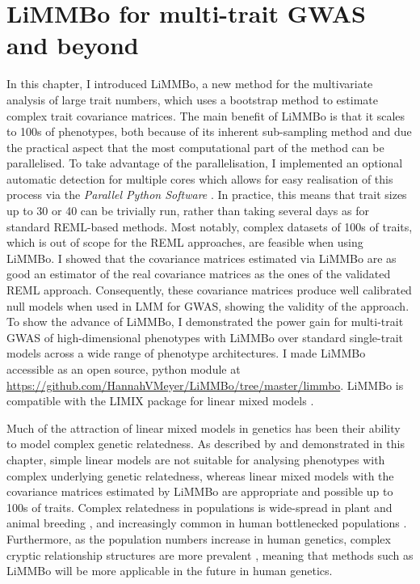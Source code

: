 \section{LiMMBo for multi-trait GWAS and beyond}
In this chapter, I introduced LiMMBo, a new method for the multivariate analysis of large trait numbers, which uses a bootstrap method to estimate complex trait covariance matrices. The main benefit of LiMMBo is that it scales to \num{100}s of phenotypes, both because of its inherent sub-sampling method and due the practical aspect that the most computational part of the method can be parallelised. To take advantage of the parallelisation, I implemented an optional automatic detection for multiple cores which allows for easy realisation of this process via the \textit{Parallel Python Software} \citep{PPSoftware}. In practice, this means that trait sizes up to 30 or 40 can be trivially run, rather than taking several days as for standard REML-based methods. Most notably, complex datasets of \num{100}s of traits, which is out of scope for the REML approaches, are feasible when using LiMMBo. I showed that the covariance matrices estimated via LiMMBo are as good an estimator of the real covariance matrices as the ones of the validated REML approach. Consequently, these covariance matrices produce well calibrated null models when used in LMM for GWAS, showing the validity of the approach. To show the advance of LiMMBo, I demonstrated the power gain for multi-trait GWAS of high-dimensional phenotypes with LiMMBo over standard single-trait models across a wide range of phenotype architectures. I made LiMMBo accessible as an open source, python module at \url{https://github.com/HannahVMeyer/LiMMBo/tree/master/limmbo}. LiMMBo is compatible with the LIMIX package for linear mixed models \citep{Lippert2014}.  

Much of the attraction of linear mixed models in genetics has been their ability to model complex genetic relatedness. As described by \citep{Kang2010} and demonstrated in this chapter, simple linear models are not suitable for analysing phenotypes with complex underlying genetic relatedness, whereas linear mixed models with the covariance matrices estimated by LiMMBo are appropriate and possible up to \num{100}s of traits. Complex relatedness in populations is wide-spread in plant and animal breeding \citep{}, and increasingly common in human bottlenecked populations \cite{Tachmazidou2013}. Furthermore, as the population numbers increase in human genetics, complex cryptic relationship structures are more prevalent \cite{Reich2001}, meaning that methods such as LiMMBo will be more applicable in the future in human genetics. 

